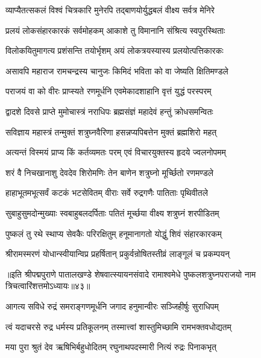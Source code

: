 \twolineshloka
{व्याप्यैतत्सकलं विश्वं चित्रकारि मुनेरपि}
{तद्बाणयोर्युद्धबलं वीक्ष्य सर्वत्र मेनिरे}%

\twolineshloka
{प्रलयं लोकसंहारकारकं सर्वमोहकम्}
{आकाशे तु विमानानि संश्रित्य स्वपुरस्थिताः}%

\twolineshloka
{विलोकयितुमागत्य प्रशंसन्ति तयोर्भृशम्}
{अयं लोकत्रयस्यास्य प्रलयोत्पत्तिकारकः}%

\twolineshloka
{असावपि महाराज रामचन्द्रस्य चानुजः}
{किमिदं भविता को वा जेष्यति क्षितिमण्डले}%

\twolineshloka
{पराजयं वा को वीरः प्राप्स्यते रणमूर्धनि}
{एवमेकादशाहानि वृत्तं युद्धं परस्परम्}%

\twolineshloka
{द्वादशे दिवसे प्राप्ते मुमोचास्त्रं नराधिपः}
{ब्रह्मसंज्ञं महादेवं हन्तुं क्रोधसमन्वितः}%

\twolineshloka
{सविज्ञाय महास्त्रं तन्मुक्तं शत्रुघ्नवैरिणा}
{हसन्नप्यपिबत्तेन मुक्तं ब्रह्मशिरो महत्}%

\twolineshloka
{अत्यन्तं विस्मयं प्राप्य किं कर्तव्यमतः परम्}
{एवं विचारयुक्तस्य हृदये ज्वलनोपमम्}%

\twolineshloka
{शरं वै निचखानाशु देवदेव शिरोमणिः}
{तेन बाणेन शत्रुघ्नो मूर्च्छितो रणमण्डले}%

\twolineshloka
{हाहाभूतमभूत्सर्वं कटकं भटसेवितम्}
{वीराः सर्वे रुद्रगणैः पातिताः पृथिवीतले}%

\twolineshloka
{सुबाहुसुमदोन्मुख्याः स्वबाहुबलदर्पिताः}
{पतितं मूर्च्छया वीक्ष्य शत्रुघ्नं शरपीडितम्}%

\twolineshloka
{पुष्कलं तु रथे स्थाप्य सेवकैः परिरक्षितुम्}
{हनूमानागतो योद्धुं शिवं संहारकारकम्}%

\twolineshloka
{श्रीरामस्मरणं योधान्स्वीयान्विप्र प्रहर्षितान्}
{प्रकुर्वन्रोषितस्तीव्रं लाङ्गूलं च प्रकम्पयन्}%

{॥इति श्रीपद्मपुराणे पातालखण्डे शेषवात्स्यायनसंवादे रामाश्वमेधे पुष्कलशत्रुघ्नपराजयो नाम त्रिचत्वारिंशत्तमोऽध्यायः॥४३॥}



\twolineshloka
{आगत्य सविधे रुद्रं समराङ्गणमूर्धनि}
{जगाद हनुमान्वीरः सञ्जिहीर्षुः सुराधिपम्}%


\twolineshloka
{त्वं यदाचरसे रुद्र धर्मस्य प्रतिकूलनम्}
{तस्मात्त्वां शास्तुमिच्छामि रामभक्तवधोद्यतम्}%

\twolineshloka
{मया पुरा श्रुतं देव ऋषिभिर्बहुधोदितम्}
{रघुनाथपदस्मारी नित्यं रुद्रः पिनाकभृत्}%

